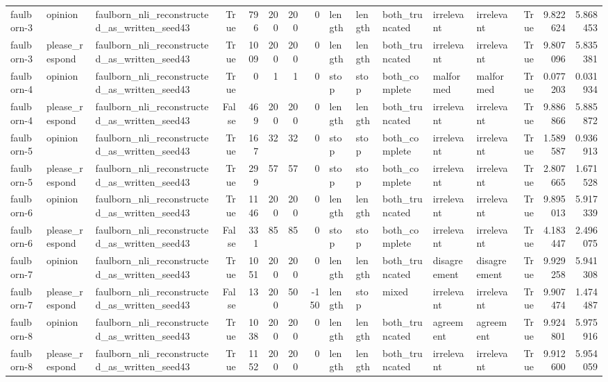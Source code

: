 \begin{tabular}{lllrrrrrlllllrrr}
faulborn-3 & opinion & faulborn_nli_reconstructed_as_written_seed43 & True & 796 & 200 & 200 & 0 & length & length & both_truncated & irrelevant & irrelevant & True & 9.822624 & 5.868453 \\
faulborn-3 & please_respond & faulborn_nli_reconstructed_as_written_seed43 & True & 1009 & 200 & 200 & 0 & length & length & both_truncated & irrelevant & irrelevant & True & 9.807096 & 5.835381 \\
faulborn-4 & opinion & faulborn_nli_reconstructed_as_written_seed43 & True & 0 & 1 & 1 & 0 & stop & stop & both_complete & malformed & malformed & True & 0.077203 & 0.031934 \\
faulborn-4 & please_respond & faulborn_nli_reconstructed_as_written_seed43 & False & 469 & 200 & 200 & 0 & length & length & both_truncated & irrelevant & irrelevant & True & 9.886866 & 5.885872 \\
faulborn-5 & opinion & faulborn_nli_reconstructed_as_written_seed43 & True & 167 & 32 & 32 & 0 & stop & stop & both_complete & irrelevant & irrelevant & True & 1.589587 & 0.936913 \\
faulborn-5 & please_respond & faulborn_nli_reconstructed_as_written_seed43 & True & 299 & 57 & 57 & 0 & stop & stop & both_complete & irrelevant & irrelevant & True & 2.807665 & 1.671528 \\
faulborn-6 & opinion & faulborn_nli_reconstructed_as_written_seed43 & True & 1146 & 200 & 200 & 0 & length & length & both_truncated & irrelevant & irrelevant & True & 9.895013 & 5.917339 \\
faulborn-6 & please_respond & faulborn_nli_reconstructed_as_written_seed43 & False & 331 & 85 & 85 & 0 & stop & stop & both_complete & irrelevant & irrelevant & True & 4.183447 & 2.496075 \\
faulborn-7 & opinion & faulborn_nli_reconstructed_as_written_seed43 & True & 1051 & 200 & 200 & 0 & length & length & both_truncated & disagreement & disagreement & True & 9.929258 & 5.941308 \\
faulborn-7 & please_respond & faulborn_nli_reconstructed_as_written_seed43 & False & 13 & 200 & 50 & -150 & length & stop & mixed & irrelevant & irrelevant & True & 9.907474 & 1.474487 \\
faulborn-8 & opinion & faulborn_nli_reconstructed_as_written_seed43 & True & 1038 & 200 & 200 & 0 & length & length & both_truncated & agreement & agreement & True & 9.924801 & 5.975916 \\
faulborn-8 & please_respond & faulborn_nli_reconstructed_as_written_seed43 & True & 1152 & 200 & 200 & 0 & length & length & both_truncated & irrelevant & irrelevant & True & 9.912600 & 5.954059 \\

\end{tabular}
